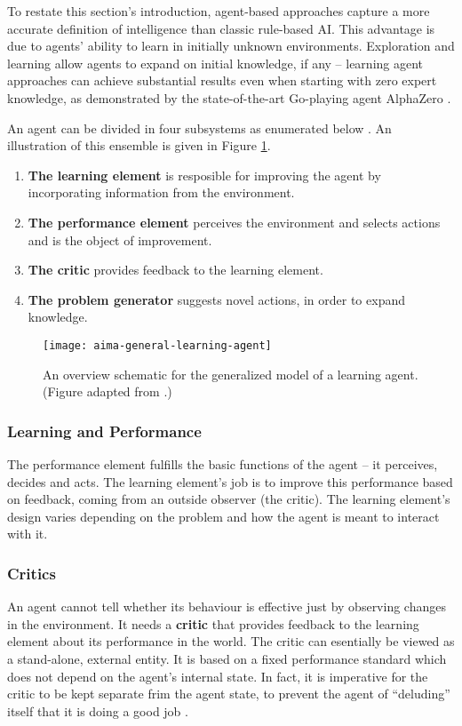 To restate this section's introduction, agent-based approaches capture a more accurate definition of intelligence than classic rule-based AI.
This advantage is due to agents' ability to learn in initially unknown environments.
Exploration and learning allow agents to expand on initial knowledge, if any --
learning agent approaches can achieve substantial results even when starting with zero expert knowledge, as demonstrated by the state-of-the-art Go-playing agent AlphaZero \cite{alpha-zero}.

An agent can be divided in four subsystems as enumerated below \cite{aima}. An illustration of this ensemble is given in Figure \ref{fig:aima-learning-agent}.
\begin{enumerate}
    \item \textbf{The learning element} is resposible for improving the agent by incorporating information from the environment.
    \item \textbf{The performance element} perceives the environment and selects actions and is the object of improvement.
    \item \textbf{The critic} provides feedback to the learning element.
    \item \textbf{The problem generator} suggests novel actions, in order to expand knowledge.    
\end{enumerate}

\begin{figure}[ht]
    \texttt{[image: aima-general-learning-agent]}
    \centering
    \caption{An overview schematic for the generalized model of a learning agent. (Figure adapted from \cite{aima}.)}
    \label{fig:aima-learning-agent}
\end{figure}

\subsubsection{Learning and Performance}
The performance element fulfills the basic functions of the agent -- it perceives, decides and acts.
The learning element's job is to improve this performance based on feedback, coming from an outside observer (the critic).
The learning element's design varies depending on the problem and how the agent is meant to interact with it.

\subsubsection{Critics}
An agent cannot tell whether its behaviour is effective just by observing changes in the environment.
It needs a \textbf{critic} that provides feedback to the learning element about its performance in the world.
The critic can esentially be viewed as a stand-alone, external entity.
It is based on a fixed performance standard which does not depend on the agent's internal state.
In fact, it is imperative for the critic to be kept separate frim the agent state, to prevent the agent of ``deluding'' itself that it is doing a good job \cite{aima}.

